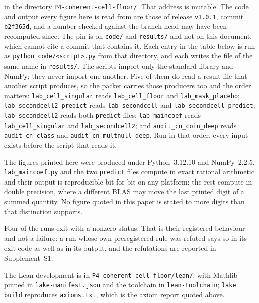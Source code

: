 \documentclass[11pt,a4paper]{article}
\theoremstyle{plain}
\theoremstyle{definition}
\theoremstyle{remark}
\begin{document}
\noindent in the directory \texttt{P4-coherent-cell-floor/}. That
address is mutable. The code and output every figure here is read from
are those of release \texttt{v1.0.1}, commit \texttt{b2f365d}, and a
number checked against the branch head may have been recomputed since.
The pin is on \texttt{code/} and \texttt{results/} and not on this
document, which cannot cite a commit that contains it. Each entry
in the table below is run as
\texttt{python code/<script>.py} from that directory, and each writes
the file of the same name in \texttt{results/}. The scripts import only
the standard library and NumPy; they never import one another. Five of
them do read a result file that another script produces, so the packet
carries those producers too and the order matters:
\texttt{lab\_cell\_singular} reads \texttt{lab\_cell\_floor} and
\texttt{lab\_mask\_placebo}; \texttt{lab\_secondcell2\_predict} reads
\texttt{lab\_secondcell} and \texttt{lab\_secondcell\_predict};
\texttt{lab\_secondcell2} reads both \texttt{predict} files;
\texttt{lab\_maincoef} reads \texttt{lab\_cell\_singular} and
\texttt{lab\_secondcell2}; and \texttt{audit\_cn\_coin\_deep} reads
\texttt{audit\_cn\_class} and \texttt{audit\_cn\_multnull\_deep}. Run in
that order, every input exists before the script that reads it.

The figures printed here were produced under Python~3.12.10 and
NumPy~2.2.5. \texttt{lab\_maincoef.py} and the two \texttt{predict}
files compute in exact rational arithmetic and their output is
reproducible bit for bit on any platform; the rest compute in double
precision, where a different BLAS may move the last printed digit of a
summed quantity. No figure quoted in this paper is stated to more
digits than that distinction supports.

Four of the runs exit with a nonzero status. That is their registered
behaviour and not a failure: a run whose own preregistered rule was
refuted says so in its exit code as well as in its output, and the
refutations are reported in Supplement~S1.

The Lean development is in \texttt{P4-coherent-cell-floor/lean/}, with
Mathlib pinned in \texttt{lake-manifest.json} and the toolchain in
\texttt{lean-toolchain}; \texttt{lake build} reproduces
\texttt{axioms.txt}, which is the axiom report quoted above.
\end{document}
